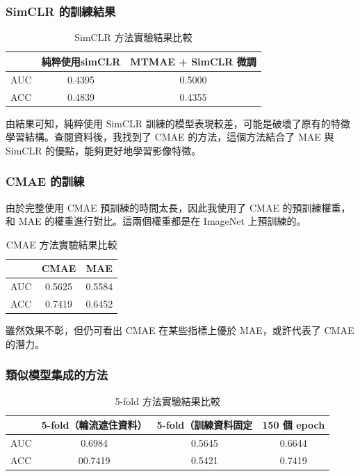 \documentclass[xcolor=dvipsnames]{beamer}
\begin{document}
    \begin{frame}
        \frametitle{SimCLR 的訓練結果}
        \begin{table}[h]
        \centering
        \begin{tabular}{lcc}
        \toprule
        & \textbf{純粹使用simCLR} & \textbf{MTMAE + SimCLR 微調} \\
        \midrule
        AUC          & 0.4395 & 0.5000 \\
        ACC          & 0.4839 & 0.4355 \\
        \bottomrule
        \end{tabular}
        \caption{SimCLR 方法實驗結果比較}
        \label{tab:simclr-results}
        \end{table}
        由結果可知，純粹使用 SimCLR 訓練的模型表現較差，可能是破壞了原有的特徵學習結構。查閱資料後，我找到了 CMAE 的方法，這個方法結合了 MAE 與 SimCLR 的優點，能夠更好地學習影像特徵。
    \end{frame}

    \begin{frame}
        \frametitle{CMAE 的訓練}
        由於完整使用 CMAE 預訓練的時間太長，因此我使用了 CMAE 的預訓練權重，和 MAE 的權重進行對比。這兩個權重都是在 ImageNet 上預訓練的。
        \begin{table}[h]
        \centering
        \begin{tabular}{lcc}
        \toprule
        & \textbf{CMAE} & \textbf{MAE} \\
        \midrule
        AUC          & 0.5625 & 0.5584 \\
        ACC          & 0.7419 & 0.6452 \\
        \bottomrule
        \end{tabular}
        \caption{CMAE 方法實驗結果比較}
        \label{tab:CMAE-results}
        \end{table}       
        雖然效果不彰，但仍可看出 CMAE 在某些指標上優於 MAE，或許代表了 CMAE 的潛力。
    \end{frame}

    \begin{frame}
        \frametitle{類似模型集成的方法}
        \begin{table}[h]
        \centering
        \begin{tabular}{lccc}
        \toprule
        & \textbf{5-fold（輪流遮住資料）} & \textbf{5-fold（訓練資料固定} & \textbf{150 個 epoch} \\
        \midrule
        AUC          & 0.6984 & 0.5645 & 0.6644\\
        ACC         & 00.7419 & 0.5421 & 0.7419\\
        \bottomrule
        \end{tabular}
        \caption{5-fold 方法實驗結果比較}
        \label{tab:5-fold-results}
        \end{table}       
    \end{frame}
\end{document}
